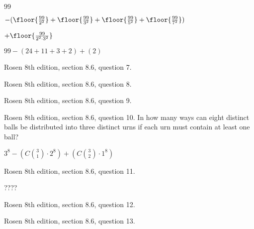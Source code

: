 $99$

$- (\floor{\frac{99}{2^2}} + \floor{\frac{99}{3^2}} + \floor{\frac{99}{5^2}}+  \floor{\frac{99}{7^2}})$

$+ \floor{\frac{99}{2^2 \cdot 3^2}}$

$99 - (24 + 11 + 3 + 2) + (2)$




\newpage
\nextq Rosen 8th edition, section 8.6, question 7.

\SOLUTION



\newpage
\nextq Rosen 8th edition, section 8.6, question 8.

\SOLUTION



\newpage
\nextq Rosen 8th edition, section 8.6, question 9.

\SOLUTION



\newpage
\nextq Rosen 8th edition, section 8.6, question 10.
In how many ways can eight distinct balls be distributed
into three distinct urns if each urn must contain at least
one ball?

$3^8 - (C\binom{3}{1} \cdot 2^8) + (C\binom{3}{2} \cdot 1^8)$

\SOLUTION



\newpage
\nextq Rosen 8th edition, section 8.6, question 11.

\SOLUTION

????
%

\newpage
\nextq Rosen 8th edition, section 8.6, question 12.

\SOLUTION



\newpage
\nextq Rosen 8th edition, section 8.6, question 13.

